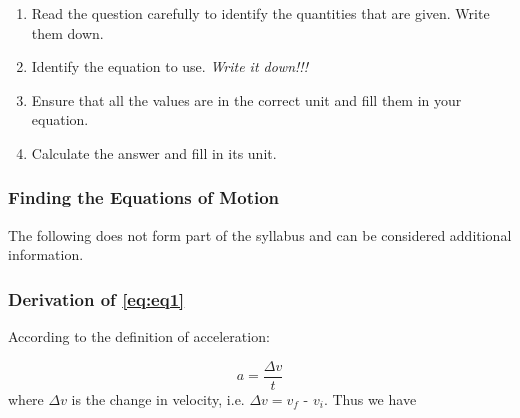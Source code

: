       \label{m38796*id76133}\begin{enumerate}[noitemsep, label=\textbf{\arabic*}. ] 
            \label{m38796*uid130}\item Read the question carefully to identify the quantities that are given. Write them down.
\label{m38796*uid131}\item Identify the equation to use. \textsl{Write it down!!!}\label{m38796*uid132}\item Ensure that all the values are in the correct unit and fill them in your equation.
\label{m38796*uid133}\item Calculate the answer and fill in its unit.
\end{enumerate}
	\par
      \label{m38796*uid134}
            \subsubsection{ Finding the Equations of Motion}
            \nopagebreak
        \label{m38796*id76225}The following does not form part of the syllabus and can be considered additional information.\par 
        \label{m38796*uid135}
            \subsubsection{ Derivation of \ref{eq:eq1}}
            \nopagebreak
          \label{m38796*id76242}According to the definition of acceleration:\par 
          \label{m38796*id76246}\nopagebreak\noindent{}
            
    \begin{equation}
    a=\frac{\Delta v}{t}
      \end{equation}
          \label{m38796*id76270}where $\Delta v$ is the change in velocity, i.e. $\Delta v={v}_{f}$ - ${v}_{i}$.
Thus we have\par 
          \label{m38796*id76324}\nopagebreak\noindent{}
            
